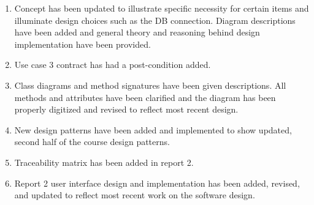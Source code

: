 \begin{enumerate}
\item Concept has been updated to illustrate specific necessity for certain items and illuminate design choices such as the DB connection. Diagram descriptions have been added and general theory and reasoning behind design implementation have been provided. 

\item Use case 3 contract has had a post-condition added.

\item Class diagrams and method signatures have been given descriptions. All methods and attributes have been clarified and the diagram has been properly digitized and revised to reflect most recent design.

\item New design patterns have been added and implemented to show updated, second half of the course design patterns.

\item Traceability matrix has been added in report 2. 

\item Report 2 user interface design and implementation has been added, revised, and updated to reflect most recent work on the software design. 

\end{enumerate}
